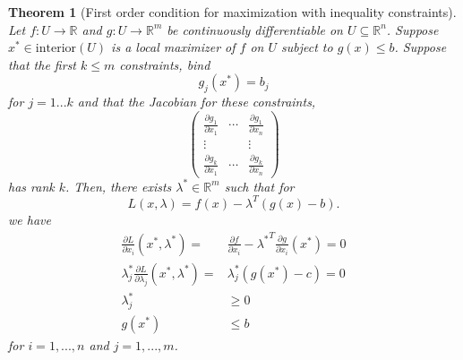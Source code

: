 \documentclass[12pt,reqno]{amsart}
\newtheorem{theorem}{Theorem}[section]
\theoremstyle{definition}
\def\R{\mathbb{R}}
\renewcommand{\to}{{\rightarrow}}
\begin{document}
\begin{theorem}[First order condition for maximization with inequality
  constraints] \label{thm:icon} 
  Let $f:U \to \R$ and $g: U \to \R^m$ be continuously
  differentiable on $U \subseteq \R^n$. Suppose $x^* \in
  \mathrm{interior}(U)$ is a local maximizer of $f$ on $U$ subject to 
  $g(x) \leq b$. Suppose that the first $k \leq m$ constraints, bind
  \[ g_j(x^*) = b_j \]
  for $j = 1 ... k$ and that the Jacobian for these constraints, 
  \[ \begin{pmatrix} 
    \frac{\partial g_1}{\partial x_1} &  \cdots &\frac{\partial g_1}{\partial x_n}  \\
    \vdots & & \vdots \\
    \frac{\partial g_k}{\partial x_1} &  \cdots &\frac{\partial g_k}{\partial x_n}  
  \end{pmatrix}
  \]
  has rank $k$. Then, there exists
  $\lambda^* \in \R^m$ such that for
  \[ L(x,\lambda) = f(x) - \lambda^T (g(x) - b). \]
  we have
  \begin{align*}
    \frac{\partial L}{\partial x_i}(x^*,\lambda^*) = & \frac{\partial
      f}{\partial x_i} - {\lambda^*}^T \frac{\partial g}{\partial
      x_i}(x^*) = 0 \\
    \lambda_j^* \frac{\partial L}{\partial \lambda_j}(x^*,\lambda^*) =
    & \lambda_j^* \left(g(x^*) - c \right)= 0 \\
    \lambda_j^* & \geq 0 \\
    g(x^*) & \leq b
  \end{align*}
  for $i = 1, ..., n$ and $j=1,...,m$.
\end{theorem}
\end{document}
